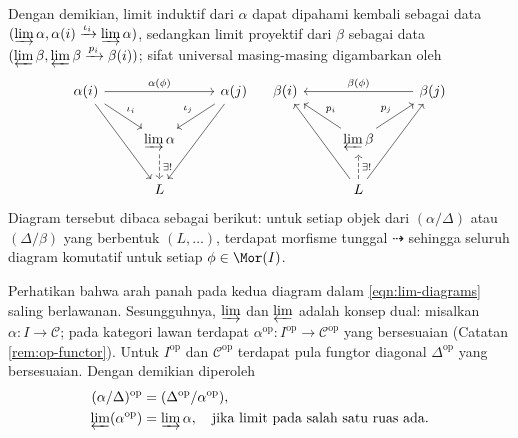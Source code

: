 Dengan demikian, limit induktif dari $\alpha$ dapat dipahami kembali sebagai data $(\varinjlim \alpha, \alpha(i) \xrightarrow{\iota_i} \varinjlim \alpha)$, sedangkan limit proyektif dari $\beta$ sebagai data $(\varprojlim \beta, \varprojlim \beta \xrightarrow{p_i} \beta(i))$; sifat universal masing-masing digambarkan oleh
\begin{equation}\label{eqn:lim-diagrams}\begin{tikzcd}
	\alpha(i) \arrow[rd, "{\iota_i}"] \arrow[rdd] \arrow[rr, "{\alpha(\phi)}"] & & \alpha(j) \arrow[ld, "{\iota_j}"'] \arrow[ldd] \\
	& \varinjlim \alpha \arrow[dashed, d, "\exists !"] &  \\
	& L &
	\end{tikzcd}\quad\begin{tikzcd}
	\beta(i) & & \beta(j) \arrow[ll, "{\beta(\phi)}"'] \\
	& \varprojlim \beta \arrow[lu, "p_i"'] \arrow[ru, "p_j"] & \\
	& L \arrow[luu] \arrow[ruu] \arrow[dashed, u, "{\exists !}"'] &
\end{tikzcd}\end{equation}
Diagram tersebut dibaca sebagai berikut: untuk setiap objek dari $(\alpha / \Delta)$ atau $(\Delta/\beta)$ yang berbentuk $(L, \ldots)$, terdapat morfisme tunggal $\dashrightarrow$ sehingga seluruh diagram komutatif untuk setiap $\phi \in \Mor(I)$.

\begin{remark}\label{rem:lim-duality}
	Perhatikan bahwa arah panah pada kedua diagram dalam \eqref{eqn:lim-diagrams} saling berlawanan. Sesungguhnya, $\varinjlim$ dan $\varprojlim$ adalah konsep dual: misalkan $\alpha: I \to \mathcal{C}$; pada kategori lawan terdapat $\alpha^\text{op}: I^\text{op} \to \mathcal{C}^\text{op}$ yang bersesuaian (Catatan \ref{rem:op-functor}). Untuk $I^\text{op}$ dan $\mathcal{C}^\text{op}$ terdapat pula fungtor diagonal $\Delta^{\text{op}}$ yang bersesuaian. Dengan demikian diperoleh
	\begin{align*}
		(\alpha / \Delta)^\text{op} & = (\Delta^\text{op} / \alpha^\text{op}), \\
		\varprojlim (\alpha^{\text{op}}) & = \varinjlim \alpha, \quad \text{jika limit pada salah satu ruas ada}.
	\end{align*}
\end{remark}


